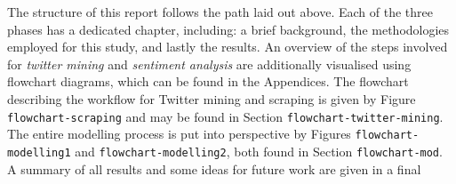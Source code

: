 \documentclass{article}
\begin{document}
The structure of this report follows the path laid out above. Each of the three phases has a dedicated chapter, including: a brief background, the methodologies employed for this study, and  lastly the results. An overview of the steps involved for \emph{twitter mining} and \emph{sentiment analysis} are additionally visualised using flowchart diagrams, which can be found in the Appendices. The flowchart describing the workflow for Twitter mining and scraping is given by Figure \texttt{flowchart-scraping} and may be found in Section \texttt{flowchart-twitter-mining}. The entire modelling process is put into perspective by Figures \texttt{flowchart-modelling1} and \texttt{flowchart-modelling2}, both found in Section \texttt{flowchart-mod}. A summary of all results and some ideas for future work are given in a final 
\end{document}
